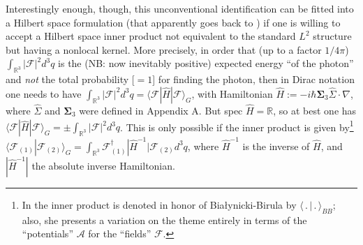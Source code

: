\documentclass[12pt]{article}
\theoremstyle{definition}
\newcommand{\AV}{\pmb{\mathcal{A}}}
\newcommand{\FV}{\pmb{\mathcal{F}}}
\numberwithin{equation}{section}
\newcommand{\Rset}{{\mathbb R}}
\newcommand{\Si}{\Sigma}
\newcommand{\nab}{\nabla}
\begin{document}
 Interestingly enough, though, this unconventional identification can be fitted into a Hilbert space formulation (that apparently
goes back to \cite{Good1957}) if one is willing to accept a Hilbert space inner product not equivalent to the standard $L^2$ structure
but having a nonlocal kernel.
 More precisely, in order that (up to a factor $1/4\pi$) $\int_{\Rset^3}|\FV|^2d^3q$ is the (NB: now inevitably positive) expected energy 
``of the photon'' and \emph{not} the total probability [$=1$] for finding the photon, then in Dirac notation 
one needs to have $\int_{\Rset^3}|\FV|^2d^3q = \langle\FV|\hat{H}|\FV\rangle_{\!G}^{}$, 
with Hamiltonian $\hat{H} :=-i\hbar{\boldsymbol\Sigma}_3\widehat{\Si}\cdot\nab$, where $\widehat{\Si}$ 
and ${\boldsymbol\Sigma}_3$ were defined in Appendix A.
 But  spec $\hat{H} =\Rset$, so at best one has $\langle\FV|\hat{H}|\FV\rangle_{\!G}^{} = \pm \int_{\Rset^3}|\FV|^2d^3q$. 
 This is only possible if the inner product is given by\footnote{In \cite{Hawton} the inner product is denoted in honor 
   of Bia{\l}ynicki-Birula by $\langle\,.\,|\,.\,\rangle_{BB}^{}$;
   also, she presents a variation on the theme entirely in terms of the ``potentials'' $\AV$ for the ``fields'' $\FV$.} 
$\langle\FV_{(1)}|\FV_{(2)}\rangle_{\!G}^{} = \int_{\Rset^3} \FV_{(1)}^\dag |\hat{H}^{-1}|\FV_{(2)} d^3q$, 
where $\hat{H}^{-1}$ is the inverse of $\hat{H}$, and $|\hat{H}^{-1}|$ the absolute inverse Hamiltonian. 
 
\end{document}

